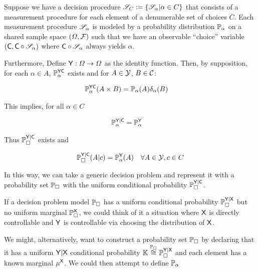 \begin{example}
Suppose we have a decision procedure $\mathscr{S}_C:=\{\mathscr{S}_\alpha|\alpha\in C\}$ that consists of a measurement procedure for each element of a denumerable set of choices $C$. Each measurement procedure $\mathscr{S}_\alpha$ is modeled by a probability distribution $\mathbb{P}_\alpha$ on a shared sample space $(\Omega,\mathcal{F})$ such that we have an observable ``choice'' variable $(\mathsf{C},\mathsf{C}\circ\mathscr{S}_\alpha)$ where $\mathsf{C}\circ\mathscr{S}_\alpha$ always yields $\alpha$.

Furthermore, Define $\mathsf{Y}:\Omega\to \Omega$ as the identity function. Then, by supposition, for each $\alpha\in A$, $\mathbb{P}_\alpha^{\mathsf{Y}\mathsf{C}}$ exists and for $A\in \mathcal{Y}$, $B\in \mathcal{C}$:

\begin{align}
    \mathbb{P}_\alpha^{\mathsf{YC}}(A\times B) &= \mathbb{P}_\alpha(A)\delta_\alpha(B)
\end{align}

This implies, for all $\alpha\in C$

\begin{align}
    \mathbb{P}_\alpha^{\mathsf{Y}|\mathsf{C}} &= \mathbb{P}_\alpha^{\mathsf{Y}}
\end{align}

Thus $\mathbb{P}_\square^{\mathsf{Y}|\mathsf{C}}$ exists and

\begin{align}
    \mathbb{P}_\square^{\mathsf{Y}|\mathsf{C}}(A|c) &= \mathbb{P}_\alpha^{\mathsf{Y}} (A)&\forall A\in \mathcal{Y},c\in C 
\end{align}

In this way, we can take a generic decision problem and represent it with a probability set $\mathbb{P}_\square$ with the uniform conditional probability $\mathbb{P}_\square^{\mathsf{Y}|\mathsf{C}}$.
\end{example}

If a decision problem model $\mathbb{P}_\square$ has a uniform conditional probability $\mathbb{P}_\square^{\mathsf{Y}|\mathsf{X}}$ but no uniform marginal $\mathbb{P}_\square^{\mathsf{X}}$, we could think of it a situation where $\mathsf{X}$ is directly controllable and $\mathsf{Y}$ is controllable via choosing the distribution of $\mathsf{X}$. 

We might, alternatively, want to construct a probability set $\mathbb{P}_\square$ by declaring that it has a uniform $\mathsf{Y}|\mathsf{X}$ conditional probability $\mathbb{K}\overset{\mathbb{P}_\square}{\cong}\mathbb{P}_\square^{\mathsf{Y}|\mathsf{X}}$ and each element has a known marginal $\mu^{\mathsf{X}}$. We could then attempt to define $\mathbb{P}_\alpha$

